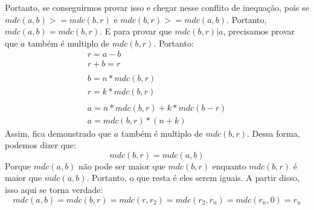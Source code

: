 \documentclass{article}
\begin{document}
    Portanto, se conseguirmos provar isso e chegar nesse conflito de inequação, pois se $mdc(a,b) >= mdc(b,r)$ e $mdc(b,r) >= mdc(a,b)$. Portanto, $mdc(a,b) = mdc(b,r)$. E para provar que $mdc(b,r) | a$, precisamos provar que $a$ também é multiplo de $mdc(b,r)$. Portanto:
    \begin{equation}
        \begin{split}
            r = a -b\\
            r + b = r\\
            \\
            b = n*mdc(b,r)\\
            r = k*mdc(b,r)\\
            \\
            a = n*mdc(b,r) + k*mdc(b-r)\\
            a = mdc(b,r) * (n+k)
        \end{split}
    \end{equation}
    Assim, fica demonstrado que $a$ também é multiplo de $mdc(b,r)$. Dessa forma, podemos dizer que:
    \[mdc(b,r) = mdc(a,b)\]
    Porque $mdc(a,b)$ não pode ser maior que $mdc(b,r)$ enquanto $mdc(b,r)$ é maior que $mdc(a,b)$. Portanto, o que resta é eles serem iguais. A partir disso, isso aqui se torna verdade:
    \begin{equation}
        mdc(a,b) = mdc(b,r) = mdc(r, r_2) = mdc(r_2, r_n) = mdc(r_n, 0) = r_n
    \end{equation}
\end{document}
